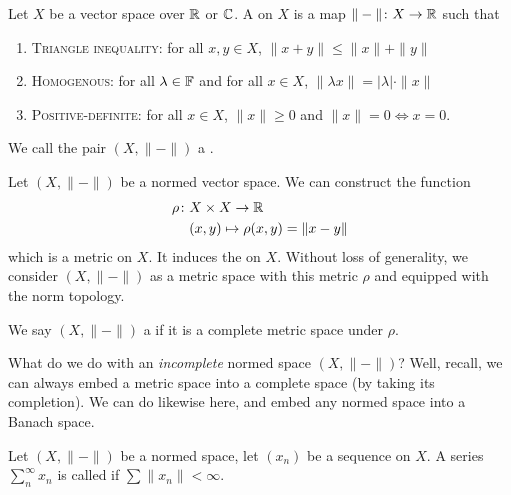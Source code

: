 

\begin{definition}
Let $X$ be a vector space over $\mathbb{R}$ or $\mathbb{C}$. A  on $X$
is a map $\|-\|\colon X\to\mathbb{R}$ such that
\begin{enumerate}
\item \textsc{Triangle inequality}: for all $x,y\in X$, $\|x+y\|\leq\|x\|+\|y\|$
\item \textsc{Homogenous}: for all $\lambda\in\mathbb{F}$ and for all $x\in X$,
  $\|\lambda x\|=|\lambda|\cdot\|x\|$
\item \textsc{Positive-definite}: for all $x\in X$, $\|x\|\geq0$ and
  $\|x\|=0\iff x=0$.
\end{enumerate}
We call the pair $(X,\|-\|)$ a .
\end{definition}

\begin{definition}
Let $(X,\|-\|)$ be a normed vector space. We can construct the function
\begin{align}
\rho\colon & X\times X\to\mathbb{R}\\
& (x,y)\mapsto\rho(x,y)=\|x-y\|\nonumber
\end{align}
which is a metric on $X$. It induces the  on $X$.
Without loss of generality, we consider $(X,\|-\|)$ as a metric space
with this metric $\rho$ and equipped with the norm topology.
\end{definition}

\begin{definition}
We say $(X,\|-\|)$ a  if it is a complete metric
space under $\rho$.
\end{definition}

\begin{remark}
What do we do with an \emph{incomplete} normed space $(X,\|-\|)$?
Well, recall, we can always embed a metric space into a complete space
(by taking its completion). We can do likewise here, and embed any
normed space into a Banach space.
\end{remark}

\begin{definition}
Let $(X,\|-\|)$ be a normed space, let $(x_{n})$ be a sequence on $X$.
A series $\sum^{\infty}_{n}x_{n}$ is called 
if $\sum\|x_{n}\|<\infty$.
\end{definition}

